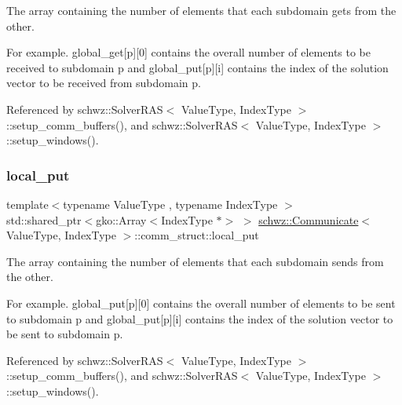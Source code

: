 The array containing the number of elements that each subdomain gets from the other. 

For example. global\+\_\+get\mbox{[}p\mbox{]}\mbox{[}0\mbox{]} contains the overall number of elements to be received to subdomain p and global\+\_\+put\mbox{[}p\mbox{]}\mbox{[}i\mbox{]} contains the index of the solution vector to be received from subdomain p. 

Referenced by schwz\+::\+Solver\+R\+A\+S$<$ Value\+Type, Index\+Type $>$\+::setup\+\_\+comm\+\_\+buffers(), and schwz\+::\+Solver\+R\+A\+S$<$ Value\+Type, Index\+Type $>$\+::setup\+\_\+windows().

\mbox{\label{structschwz_1_1Communicate_1_1comm__struct_a62a9e5c1988b1bf948148ff2f137a900}} 
\subsubsection{\texorpdfstring{local\+\_\+put}{local\_put}}
{\footnotesize\ttfamily template$<$typename Value\+Type , typename Index\+Type $>$ \\
std\+::shared\+\_\+ptr$<$gko\+::\+Array$<$Index\+Type $\ast$$>$ $>$ \hyperlink{classschwz_1_1Communicate}{schwz\+::\+Communicate}$<$ Value\+Type, Index\+Type $>$\+::comm\+\_\+struct\+::local\+\_\+put}



The array containing the number of elements that each subdomain sends from the other. 

For example. global\+\_\+put\mbox{[}p\mbox{]}\mbox{[}0\mbox{]} contains the overall number of elements to be sent to subdomain p and global\+\_\+put\mbox{[}p\mbox{]}\mbox{[}i\mbox{]} contains the index of the solution vector to be sent to subdomain p. 

Referenced by schwz\+::\+Solver\+R\+A\+S$<$ Value\+Type, Index\+Type $>$\+::setup\+\_\+comm\+\_\+buffers(), and schwz\+::\+Solver\+R\+A\+S$<$ Value\+Type, Index\+Type $>$\+::setup\+\_\+windows().

\mbox{\label{structschwz_1_1Communicate_1_1comm__struct_a39335cd2ee211817d66189fa6bff7d04}} 
